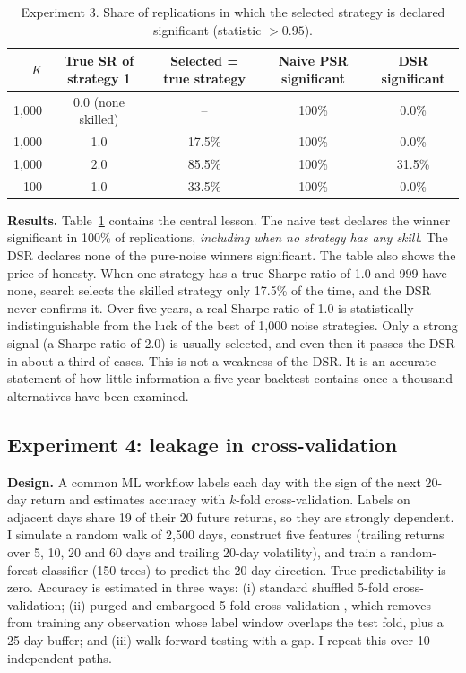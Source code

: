 \documentclass[11pt]{article}
\begin{document}
\begin{table}[h]
\centering
\caption{Experiment 3. Share of replications in which the selected strategy is declared significant (statistic $> 0.95$).}
\label{tab:exp3}
\small
\begin{tabular}{rcccc}
\toprule
$K$ & True SR of strategy 1 & Selected = true strategy & Naive PSR significant & DSR significant \\
\midrule
1{,}000 & 0.0 (none skilled) & -- & 100\% & 0.0\% \\
1{,}000 & 1.0 & 17.5\% & 100\% & 0.0\% \\
1{,}000 & 2.0 & 85.5\% & 100\% & 31.5\% \\
100     & 1.0 & 33.5\% & 100\% & 0.0\% \\
\bottomrule
\end{tabular}
\end{table}

\textbf{Results.} Table~\ref{tab:exp3} contains the central lesson. The naive test declares the winner significant in 100\% of replications, \emph{including when no strategy has any skill}. The DSR declares none of the pure-noise winners significant. The table also shows the price of honesty. When one strategy has a true Sharpe ratio of 1.0 and 999 have none, search selects the skilled strategy only 17.5\% of the time, and the DSR never confirms it. Over five years, a real Sharpe ratio of 1.0 is statistically indistinguishable from the luck of the best of 1{,}000 noise strategies. Only a strong signal (a Sharpe ratio of 2.0) is usually selected, and even then it passes the DSR in about a third of cases. This is not a weakness of the DSR. It is an accurate statement of how little information a five-year backtest contains once a thousand alternatives have been examined.

\subsection{Experiment 4: leakage in cross-validation}
\textbf{Design.} A common ML workflow labels each day with the sign of the next 20-day return and estimates accuracy with $k$-fold cross-validation. Labels on adjacent days share 19 of their 20 future returns, so they are strongly dependent. I simulate a random walk of 2{,}500 days, construct five features (trailing returns over 5, 10, 20 and 60 days and trailing 20-day volatility), and train a random-forest classifier (150 trees) to predict the 20-day direction. True predictability is zero. Accuracy is estimated in three ways: (i) standard shuffled 5-fold cross-validation; (ii) purged and embargoed 5-fold cross-validation \citep{lopezdeprado2018}, which removes from training any observation whose label window overlaps the test fold, plus a 25-day buffer; and (iii) walk-forward testing with a gap. I repeat this over 10 independent paths.
\end{document}
